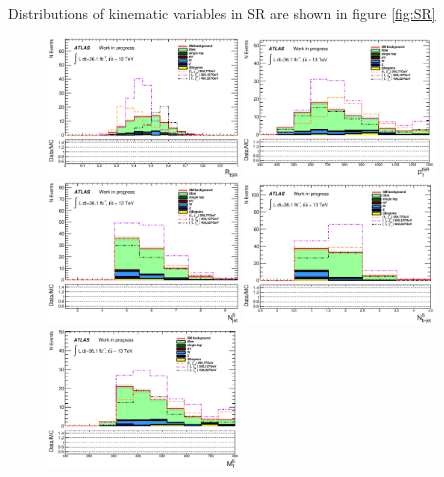 \indent Distributions of kinematic variables in SR are shown in figure \ref{fig:SR} \\

\begin{figure}[htbp]
  \begin{center}
    \includegraphics[width=0.45\textwidth]{figures/plotSR/SR_ND1_RISR_7SR.eps}
    \includegraphics[width=0.45\textwidth]{figures/plotSR/SR_ND1_PTISR_7SR.eps}
    \includegraphics[width=0.45\textwidth]{figures/plotSR/SR_ND1_NjV_7SR.eps}
    \includegraphics[width=0.45\textwidth]{figures/plotSR/SR_NbV_7SR.eps}
    \includegraphics[width=0.45\textwidth]{figures/plotSR/SR_ND1_MS_7SR.eps}

\end{center}
\end{figure}
